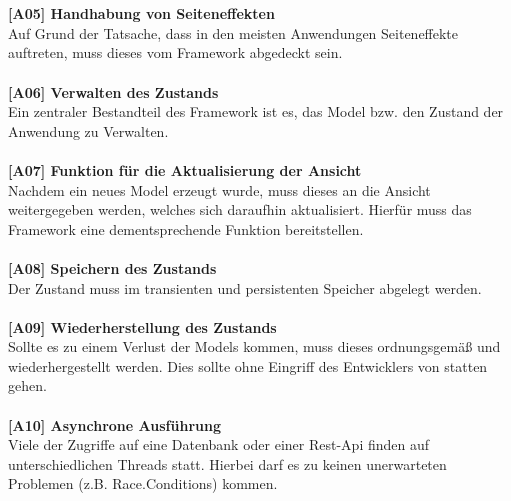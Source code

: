 \\
\\
\textbf{[A05] Handhabung von Seiteneffekten}
\\
Auf Grund der Tatsache, dass in den meisten Anwendungen Seiteneffekte auftreten, muss dieses vom Framework abgedeckt sein.
\\
\\
\textbf{[A06] Verwalten des Zustands}
\\
Ein zentraler Bestandteil des Framework ist es, das Model bzw. den Zustand der Anwendung zu Verwalten. 
\\
\\
\textbf{[A07] Funktion für die Aktualisierung der Ansicht}
\\
Nachdem ein neues Model erzeugt wurde, muss dieses an die Ansicht weitergegeben werden, welches sich daraufhin aktualisiert. Hierfür muss das Framework eine dementsprechende Funktion bereitstellen.
\\
\\
\textbf{[A08] Speichern des Zustands}
\\
Der Zustand muss im transienten und persistenten Speicher abgelegt werden.
\\
\\
\textbf{[A09] Wiederherstellung des Zustands}
\\
Sollte es zu einem Verlust der Models kommen, muss dieses ordnungsgemäß und wiederhergestellt werden.
Dies sollte ohne Eingriff des Entwicklers von statten gehen.
\\
\\
\textbf{[A10] Asynchrone Ausführung}
\\
Viele der Zugriffe auf eine Datenbank oder einer Rest-Api finden auf unterschiedlichen Threads statt.
Hierbei darf es zu keinen unerwarteten Problemen (z.B. Race.Conditions) kommen.
\\
\\
